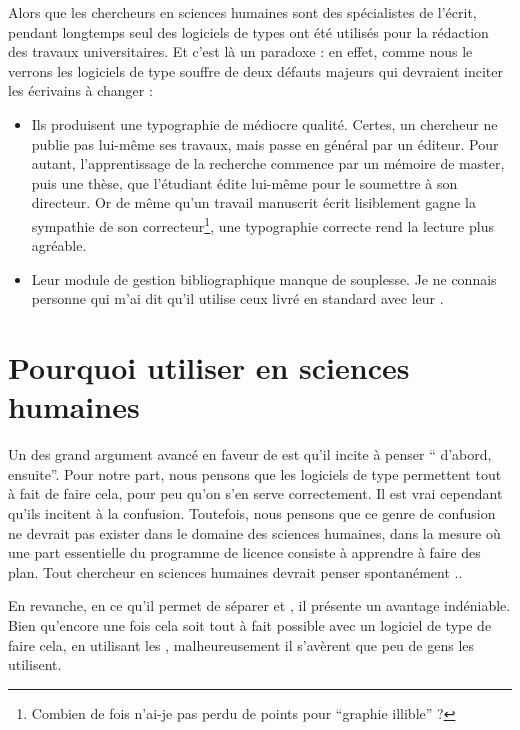 Alors que les chercheurs en sciences humaines sont des spécialistes de l'écrit, pendant longtemps seul des logiciels de types  ont été utilisés pour la rédaction des travaux universitaires. Et c'est là un paradoxe : en effet, comme nous le verrons les logiciels de type  souffre de deux défauts majeurs qui devraient inciter les écrivains à changer :
\begin{itemize}
\item Ils produisent une typographie de médiocre qualité. Certes, un chercheur ne publie pas lui-même ses travaux, mais passe en général par un éditeur. Pour autant, l'apprentissage de la recherche commence par un mémoire de master, puis une thèse, que l'étudiant édite lui-même pour le soumettre à son directeur. Or de même qu'un travail manuscrit écrit lisiblement gagne la sympathie de son correcteur\footnote{Combien de fois n'ai-je pas perdu de points pour \enquote{graphie illible} ?},  une typographie correcte rend la lecture plus agréable.
\item Leur module de gestion bibliographique manque de souplesse. Je ne connais personne qui m'ai dit qu'il utilise ceux livré en standard avec leur .
\end{itemize}

\section{Pourquoi utiliser  en sciences humaines}

Un des grand argument avancé en faveur de  est qu'il incite à penser \enquote{ d'abord,  ensuite}. Pour notre part, nous pensons que les logiciels de type  permettent tout à fait de faire cela, pour peu qu'on s'en serve correctement. Il est vrai cependant qu'ils incitent à la confusion. Toutefois, nous pensons que ce genre de confusion ne devrait pas exister dans le domaine des sciences humaines, dans la mesure où une part essentielle du programme de licence consiste à apprendre à faire des plan. Tout chercheur en sciences humaines devrait penser spontanément ..

En revanche, en ce qu'il permet de séparer  et , il présente un avantage indéniable. Bien qu'encore une fois cela soit tout à fait possible avec un logiciel de type  de faire cela, en utilisant les , malheureusement il s'avèrent que peu de gens les utilisent.


